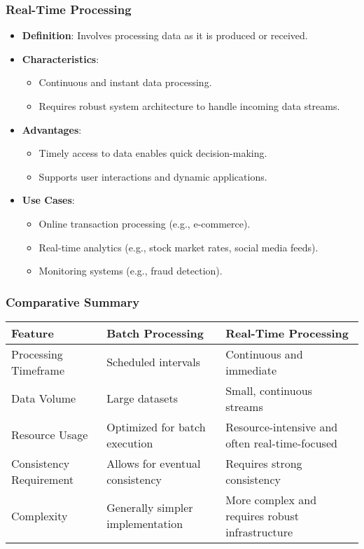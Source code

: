 \documentclass[aspectratio=169]{beamer}
\begin{document}
\begin{frame}[fragile]
    \frametitle{Real-Time Processing}
    \begin{itemize}
        \item \textbf{Definition}: Involves processing data as it is produced or received.
        \item \textbf{Characteristics}:
        \begin{itemize}
            \item Continuous and instant data processing.
            \item Requires robust system architecture to handle incoming data streams.
        \end{itemize}
        \item \textbf{Advantages}:
        \begin{itemize}
            \item Timely access to data enables quick decision-making.
            \item Supports user interactions and dynamic applications.
        \end{itemize}
        \item \textbf{Use Cases}:
        \begin{itemize}
            \item Online transaction processing (e.g., e-commerce).
            \item Real-time analytics (e.g., stock market rates, social media feeds).
            \item Monitoring systems (e.g., fraud detection).
        \end{itemize}
    \end{itemize}
\end{frame}

\begin{frame}[fragile]
    \frametitle{Comparative Summary}
    \begin{tabular}{|l|l|l|}
        \hline
        \textbf{Feature} & \textbf{Batch Processing} & \textbf{Real-Time Processing} \\ \hline
        Processing Timeframe & Scheduled intervals & Continuous and immediate \\ \hline
        Data Volume & Large datasets & Small, continuous streams \\ \hline
        Resource Usage & Optimized for batch execution & Resource-intensive and often real-time-focused \\ \hline
        Consistency Requirement & Allows for eventual consistency & Requires strong consistency \\ \hline
        Complexity & Generally simpler implementation & More complex and requires robust infrastructure \\ \hline
    \end{tabular}
\end{frame}
\end{document}
